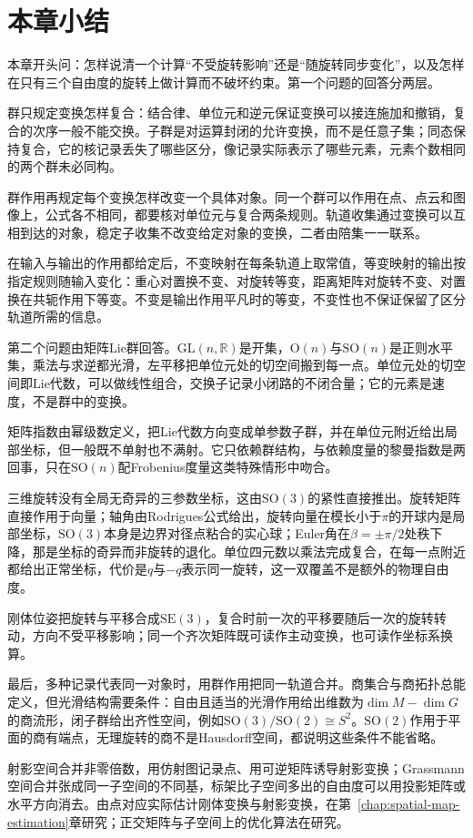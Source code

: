 \section{本章小结}
\label{sec:lie-summary}

本章开头问：怎样说清一个计算“不受旋转影响”还是“随旋转同步变化”，以及怎样在只有三个自由度的旋转上做计算而不破坏约束。第一个问题的回答分两层。

群只规定变换怎样复合：结合律、单位元和逆元保证变换可以接连施加和撤销，复合的次序一般不能交换。子群是对运算封闭的允许变换，而不是任意子集；同态保持复合，它的核记录丢失了哪些区分，像记录实际表示了哪些元素，元素个数相同的两个群未必同构。

群作用再规定每个变换怎样改变一个具体对象。同一个群可以作用在点、点云和图像上，公式各不相同，都要核对单位元与复合两条规则。轨道收集通过变换可以互相到达的对象，稳定子收集不改变给定对象的变换，二者由陪集一一联系。

在输入与输出的作用都给定后，不变映射在每条轨道上取常值，等变映射的输出按指定规则随输入变化：重心对置换不变、对旋转等变，距离矩阵对旋转不变、对置换在共轭作用下等变。不变是输出作用平凡时的等变，不变性也不保证保留了区分轨道所需的信息。

第二个问题由矩阵Lie群回答。$\mathrm{GL}(n,\mathbb R)$是开集，$\mathrm O(n)$与$\mathrm{SO}(n)$是正则水平集，乘法与求逆都光滑，左平移把单位元处的切空间搬到每一点。单位元处的切空间即Lie代数，可以做线性组合，交换子记录小闭路的不闭合量；它的元素是速度，不是群中的变换。

矩阵指数由幂级数定义，把Lie代数方向变成单参数子群，并在单位元附近给出局部坐标，但一般既不单射也不满射。它只依赖群结构，与依赖度量的黎曼指数是两回事，只在$\mathrm{SO}(n)$配Frobenius度量这类特殊情形中吻合。

三维旋转没有全局无奇异的三参数坐标，这由$\mathrm{SO}(3)$的紧性直接推出。旋转矩阵直接作用于向量；轴角由Rodrigues公式给出，旋转向量在模长小于$\pi$的开球内是局部坐标，$\mathrm{SO}(3)$本身是边界对径点粘合的实心球；Euler角在$\beta=\pm\pi/2$处秩下降，那是坐标的奇异而非旋转的退化。单位四元数以乘法完成复合，在每一点附近都给出正常坐标，代价是$q$与$-q$表示同一旋转，这一双覆盖不是额外的物理自由度。

刚体位姿把旋转与平移合成$\mathrm{SE}(3)$，复合时前一次的平移要随后一次的旋转转动，方向不受平移影响；同一个齐次矩阵既可读作主动变换，也可读作坐标系换算。

最后，多种记录代表同一对象时，用群作用把同一轨道合并。商集合与商拓扑总能定义，但光滑结构需要条件：自由且适当的光滑作用给出维数为$\dim M-\dim G$的商流形，闭子群给出齐性空间，例如$\mathrm{SO}(3)/\mathrm{SO}(2)\cong S^2$。$\mathrm{SO}(2)$作用于平面的商有端点，无理旋转的商不是Hausdorff空间，都说明这些条件不能省略。

射影空间合并非零倍数，用仿射图记录点、用可逆矩阵诱导射影变换；Grassmann空间合并张成同一子空间的不同基，标架比子空间多出的自由度可以用投影矩阵或水平方向消去。由点对应实际估计刚体变换与射影变换，在第~\ref{chap:spatial-map-estimation}章研究；正交矩阵与子空间上的优化算法在研究。
